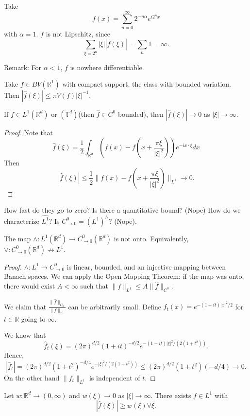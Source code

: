 \documentclass[11pt]{scrartcl}
\newcommand{\R}{\mathbb{R}}
\newcommand{\T}{\mathbb T}
\let \hat \widehat
\newcommand{\<}{\langle}
\renewcommand{\>}{\rangle}
\begin{document}
\begin{example} Take $$f(x) = \sum_{n = 0}^{\infty} 2^{-n\alpha}e^{i2^n x}$$ with $\alpha = 1$.  $f$ is not Lipschitz, since $$\sum_{\xi = 2^n} |\xi||\hat{f}(\xi)| = \sum_{n} 1 = \infty.$$

Remark: For $\alpha < 1$, $f$ is nowhere differentiable.
\end{example}
\begin{example}
Take $f \in BV(\R^1)$ with compact support, the class with bounded variation.  Then $|\hat{f}(\xi)| \le \pi V(f) |\xi|^{-1}$.  
\end{example}
\begin{lemma}  If $f \in L^1(\R^d)$ or $(\T^d)$(then $\hat{f} \in C^0$ bounded), then $|\hat{f}(\xi)| \rightarrow 0$ as $|\xi| \rightarrow \infty$.
\end{lemma}
\begin{proof}
Note that $$\hat{f}(\xi) = \frac{1}{2}\int_{\R^d} (f(x) - f(x+\frac{\pi \xi}{|\xi|^2})) e^{-ix\cdot \xi}dx$$
Then 
$$|\hat{f}(\xi)| \le \frac{1}{2} \|f(x) - f(x + \frac{\pi \xi}{|\xi|^2})\|_{L^1} \rightarrow 0.$$
\end{proof}
How fast do they go to zero?  Is there a quantitative bound? (Nope) How do we characterize $\hat{L^1}?$  Is $C_{\rightarrow 0}^0 = (L^1)^{\wedge}$? (Nope).
\begin{proposition} The map $\wedge: L^1(\R^d) \rightarrow C_{\rightarrow 0}^0(\R^d)$ is not onto.  Equivalently, $\vee: C_{\rightarrow 0}^0(\R^d) \not \rightarrow L^1$.
\end{proposition}
\begin{proof}
$\wedge: L^1 \rightarrow C_{\rightarrow 0}^0$ is linear, bounded, and an injective mapping between Banach spaces.  We can apply the Open Mapping Theorem:  if the map was onto, there would exist $A<\infty$ such that $\|f\|_{L^1} \le A \|\hat{f}\|_{C^0}$.  

We claim that $\frac{\|\hat{f}\|_{C_0}}{\|f\|_{L^1}}$ can be arbitrarily small.  Define $f_t(x) = e^{-(1+it)|x|^2/2}$ for $t \in \R$ going to $\infty$.

We know that $$\hat{f}_t(\xi) = (2\pi)^{d/2}(1+it)^{-d/2}e^{-(1-it)|\xi|^2/(2(1+t^2))}.$$
Hence,
$$|\hat{f}_t| = (2\pi)^{d/2}(1+t^2)^{-d/4} e^{-|\xi|^2/(2(1+t^2))} \le (2\pi)^{d/2}(1+t^2)(-d/4) \rightarrow 0.$$
On the other hand $\|f_t\|_{L^1}$ is independent of $t$.  
\end{proof}
\begin{thm} Let $w:\R^d \rightarrow (0, \infty)$ and $w(\xi) \rightarrow 0$ as $|\xi|\rightarrow \infty$.  There exists $f \in L^1$ with 
$$|\hat{f}(\xi)| \ge w(\xi) \forall \xi.$$
\end{thm}
\end{document}
